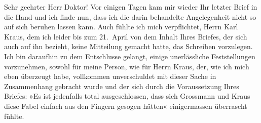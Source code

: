 \pstart{}Sehr geehrter Herr Doktor!\pend\vspace{0.5em}
\pstart
           Vor einigen Tagen kam mir wieder Ihr letzter Brief in die Hand und ich finde nun,
               dass ich die darin behandelte Angelegenheit nicht so auf sich beruhen lassen kann.
               Auch fühlte ich mich verpflichtet, Herrn Karl
                  Kraus, dem ich leider bis zum 21. April von dem Inhalt Ihres
               Briefes, der sich auch auf ihn bezieht, keine Mitteilung gemacht hatte, das Schreiben
               vorzulegen. Ich bin daraufhin zu dem Entschlusse gelangt, einige unerlässliche
               Feststellungen vorzunehmen, sowohl für meine Person, wie für Herrn Kraus, der, wie ich mich eben überzeugt habe,
               vollkommen unverschuldet mit dieser Sache in Zusammenhang gebracht wurde und der sich
               durch die Voraussetzung Ihres Briefes: »Es ist jedenfalls total ausgeschlossen, dass
               sich Grossmann und Kraus diese Fabel einfach aus den Fingern gesogen hätten«
               einigermassen überrascht fühlte.\pend
           
